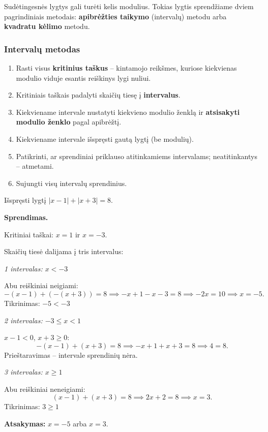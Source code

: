 Sudėtingesnės lygtys gali turėti kelis modulius. Tokias lygtis sprendžiame dviem pagrindiniais metodais: \textbf{apibrėžties taikymo} (intervalų) metodu arba \textbf{kvadratu kėlimo} metodu.

\subsubsection{Intervalų metodas}

\begin{tcolorbox}[colback=green!5!white, colframe=green!50!black, title=Intervalų metodo algoritmas]
\begin{enumerate}
    \item Rasti visus \textbf{kritinius taškus} -- kintamojo reikšmes, kuriose kiekvienas modulio viduje esantis reiškinys lygi nuliui.
    \item Kritiniais taškais padalyti skaičių tiesę į \textbf{intervalus}.
    \item Kiekviename intervale nustatyti kiekvieno modulio ženklą ir \textbf{atsisakyti modulio ženklo} pagal apibrėžtį.
    \item Kiekviename intervale išspręsti gautą lygtį (be modulių).
    \item Patikrinti, ar sprendiniai priklauso atitinkamiems intervalams; neatitinkantys -- atmetami.
    \item Sujungti visų intervalų sprendinius.
\end{enumerate}
\end{tcolorbox}

\begin{example}
Išspręsti lygtį $|x - 1| + |x + 3| = 8$.

\textbf{Sprendimas.}

Kritiniai taškai: $x = 1$ ir $x = -3$.

Skaičių tiesė dalijama į tris intervalus:

\medskip
\begin{center}
\end{center}

\medskip
\textit{1 intervalas: $x < -3$}

Abu reiškiniai neigiami:
\[
-(x-1) + (-(x+3)) = 8 \implies -x+1-x-3 = 8 \implies -2x = 10 \implies x = -5.
\]
Tikrinimas: $-5 < -3$ \checkmark

\textit{2 intervalas: $-3 \leq x < 1$}

$x - 1 < 0$, $x + 3 \geq 0$:
\[
-(x-1) + (x+3) = 8 \implies -x+1+x+3 = 8 \implies 4 = 8.
\]
Prieštaravimas -- intervale sprendinių nėra.

\textit{3 intervalas: $x \geq 1$}

Abu reiškiniai neneigiami:
\[
(x-1) + (x+3) = 8 \implies 2x + 2 = 8 \implies x = 3.
\]
Tikrinimas: $3 \geq 1$ \checkmark

\textbf{Atsakymas:} $x = -5$ arba $x = 3$.
\end{example}

